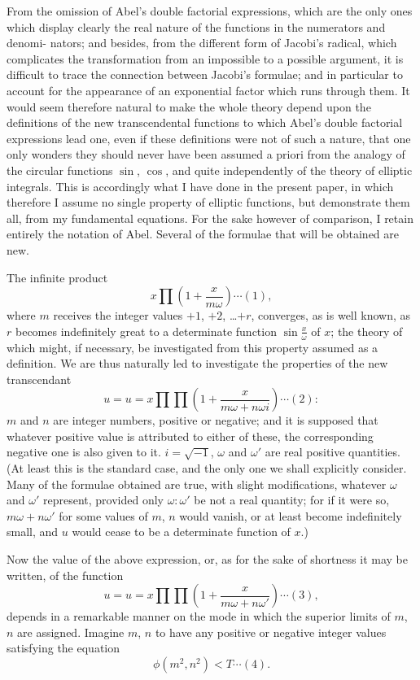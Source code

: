 \documentclass[12pt,a4paper]{article}
\begin{document}
From the omission of Abel's double factorial expressions, which are the only ones
which display clearly the real nature of the functions in the numerators and denomi-
nators; and besides, from the different form of Jacobi's radical, which complicates the
transformation from an impossible to a possible argument, it is difficult to trace the
connection between Jacobi's formulae; and in particular to account for the appearance
of an exponential factor which runs through them. It would seem therefore natural to
make the whole theory depend upon the definitions of the new transcendental functions
to which Abel's double factorial expressions lead one, even if these definitions were not
of such a nature, that one only wonders they should never have been assumed a priori
from the analogy of the circular functions $\sin$, $\cos$, and quite independently of the
theory of elliptic integrals. This is accordingly what I have done in the present paper,
in which therefore I assume no single property of elliptic functions, but demonstrate
them all, from my fundamental equations. For the sake however of comparison, I retain
entirely the notation of Abel. Several of the formulae that will be obtained are new.

\newpage
\setcounter{page}{137}

The infinite product
\[
x \prod \left(1 + \frac{x}{m\omega}\right) \cdots (1),
\]
where $m$ receives the integer values $+1$, $+2$, \ldots $+r$, converges, as is well known, as
$r$ becomes indefinitely great to a determinate function $\sin \frac{x}{\omega}$ of $x$; the theory of which
might, if necessary, be investigated from this property assumed as a definition. We are
thus naturally led to investigate the properties of the new transcendant
\[
u = u = x \prod \prod \left(1 + \frac{x}{m\omega + n\omega i}\right) \cdots (2):
\]
$m$ and $n$ are integer numbers, positive or negative; and it is supposed that whatever
positive value is attributed to either of these, the corresponding negative one is also
given to it. $i = \sqrt{-1}$, $\omega$ and $\omega'$ are real positive quantities. (At least this is the
standard case, and the only one we shall explicitly consider. Many of the formulae
obtained are true, with slight modifications, whatever $\omega$ and $\omega'$ represent, provided
only $\omega : \omega'$ be not a real quantity; for if it were so, $m\omega + n\omega'$ for some values of
$m$, $n$ would vanish, or at least become indefinitely small, and $u$ would cease to be
a determinate function of $x$.)

Now the value of the above expression, or, as for the sake of shortness it may
be written, of the function
\[
u = u = x \prod \prod \left(1 + \frac{x}{m\omega + n\omega'}\right) \cdots (3),
\]
depends in a remarkable manner on the mode in which the superior limits of $m$, $n$
are assigned. Imagine $m$, $n$ to have any positive or negative integer values satisfying the
equation
\[
\phi(m^2, n^2) < T \cdots (4).
\]
\end{document}
